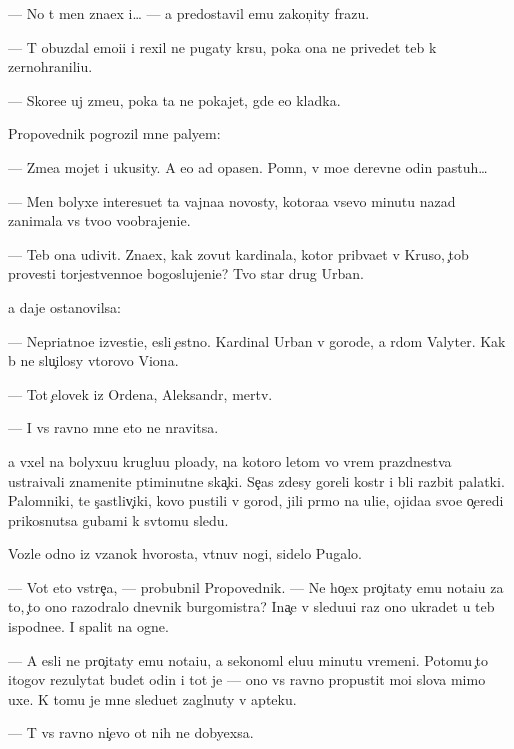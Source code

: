 \documentclass[10pt]{book}
\begin{document}
— No t{\yi} men{\ia} zna{\y}ex i… — {\Y}a predostavil {\y}emu zakon{\c}ity frazu.

— T{\yi} obuzdal emo{\q}i{\y}i i rexil ne pugaty kr{\yi}su, poka ona ne privedet teb{\ia} k zernohranili{\x}u.

— Skore{\y}e uj zme{\y}u, poka ta ne pokajet, gde {\y}e{\y}o kladka.

Propovednik pogrozil mne paly{\q}em:

— Zme{\y}a mojet i ukusity. A {\y}e{\y}o {\y}ad opasen. Pomn{\iu}, v mo{\y}e{\y} derevne odin pastuh…

— Men{\ia} bolyxe interesu{\y}et ta vajna{\y}a novosty, kotora{\y}a vsevo minutu nazad zanimala vs{\e} tvo{\y}o voobrajeni{\y}e.

— Teb{\ia} ona udivit. Zna{\y}ex, kak zovut kardinala, kotor{\yi}{\y} prib{\yi}va{\y}et v Kruso, {\c}tob{\yi} provesti torjestvenno{\y}e bogoslujeni{\y}e? Tvo{\y} star{\yi}{\y} drug Urban.

{\Y}a daje ostanovilsa:

— Nepri{\y}atno{\y}e izvesti{\y}e, {\y}esli {\c}estno. Kardinal Urban v gorode, a r{\ia}dom Valyter. Kak b{\yi} ne slu{\c}ilosy vtorovo Viona.

— Tot {\c}elovek iz Ordena, Aleksandr, mertv.

— I vs{\e} ravno mne eto ne nravitsa.

{\Y}a v{\yi}xel na bolyxu{\y}u kruglu{\y}u plo{\x}ady, na kotoro{\y} letom vo vrem{\ia} prazdnestva ustra{\y}ivali znamenit{\yi}{\y}e p{\ia}timinutn{\yi}{\y}e ska{\c}ki. Se{\y}{\c}as zdesy goreli kostr{\yi} i b{\yi}li razbit{\yi} palatki. Palomniki, te s{\c}astliv{\c}iki, kovo pustili v gorod, jili pr{\ia}mo na uli{\q}e, ojida{\y}a svo{\y}e{\y} o{\c}eredi prikosnutsa gubami k sv{\ia}tomu sledu.

Vozle odno{\y} iz v{\ia}zanok hvorosta, v{\yi}t{\ia}nuv nogi, sidelo Pugalo.

— Vot eto vstre{\c}a, — probubnil Propovednik. — Ne ho{\c}ex pro{\c}itaty {\y}emu nota{\q}i{\y}u za to, {\c}to ono razodralo dnevnik burgomistra? Ina{\c}e v sledu{\y}u{\x}i{\y} raz ono ukradet u teb{\ia} ispodne{\y}e. I spalit na ogne.

— A {\y}esli ne pro{\c}itaty {\y}emu nota{\q}i{\y}u, {\y}a sekonoml{\iu} {\q}elu{\y}u minutu vremeni. Potomu {\c}to itogov{\yi}{\y} rezulytat budet odin i tot je — ono vs{\e} ravno propustit mo{\y}i slova mimo uxe{\y}. K tomu je mne sledu{\y}et zagl{\ia}nuty v apteku.

— T{\yi} vs{\e} ravno ni{\c}evo ot nih ne dobyexsa.
\end{document}
